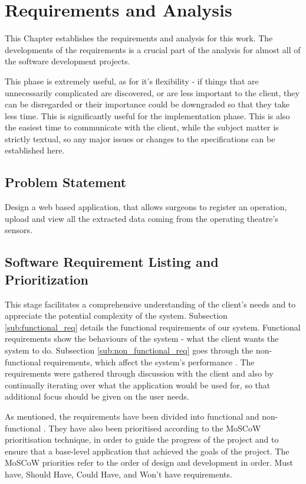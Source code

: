 \chapter{Requirements and Analysis}
\label{chapterlabel3}


This Chapter establishes the requirements and analysis for this work. The developments of the requirements is a crucial part of the analysis for almost all of the software development projects.

This phase is extremely useful, as for it's flexibility - if things that are unnecessarily complicated are discovered, or are less important to the client, they can be disregarded  or their importance could be downgraded so that they take less time. This is significantly useful for the implementation phase. This is also the easiest time to communicate with the client, while the subject matter is strictly textual, so any major issues or changes to the specifications can be established here.


\section{Problem Statement}
\label{problem_st}

Design a web based application, that allows surgeons to register an operation, upload and view all the extracted data coming from the operating theatre's sensors.


\section{Software Requirement Listing and Prioritization}
\label{sec:softreqlistandprior} 

This stage facilitates a comprehensive understanding of the client's needs and to appreciate the potential complexity of the system. Subsection \ref{sub:functional_req} details the functional requirements of our system.  Functional requirements show the behaviours of the system - what the client wants the system to do.  Subsection \ref{sub:non_functional_req} goes through the non-functional requirements, which affect the system's performance . 
The requirements were gathered through discussion with the client and also by continually iterating over what the application would be used for, so that additional focus should be given on the user needs.


 As mentioned, the requirements have been divided into functional and non-functional \cite{Software_Requirements}. They have also been prioritised according to the MoSCoW prioritisation technique\cite{cleggbarker1994}, in order to guide the progress of the project and to ensure that a base-level application that achieved the goals of the project. The MoSCoW priorities refer to the order of design and development in order. Must have, Should Have, Could Have, and Won't have requirements.




